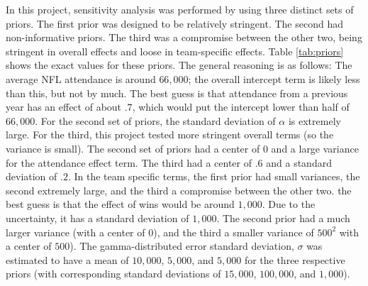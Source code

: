 \documentclass[11pt]{article}
\begin{document}
In this project, sensitivity analysis was performed by using three distinct sets of priors. The first prior was designed to be relatively stringent. The second had non-informative priors. The third was a compromise between the other two, being stringent in overall effects and loose in team-specific effects. Table \ref{tab:priors} shows the exact values for these priors. The general reasoning is as follows: The average NFL attendance is around $66{,}000$; the overall intercept term is likely less than this, but not by much. The best guess is that attendance from a previous year has an effect of about $.7$, which would put the intercept lower than half of $66{,}000$. For the second set of priors, the standard deviation of $\alpha$ is extremely large. For the third, this project tested more stringent overall terms (so the variance is small). The second set of priors had a center of $0$ and a large variance for the attendance effect term. The third had a center of $.6$ and a standard deviation of $.2$. In the team specific terms, the first prior had small variances, the second extremely large, and the third a compromise between the other two. the best guess is that the effect of wins would be around $1{,}000$. Due to the uncertainty, it has a standard deviation of $1{,}000$. The second prior had a much larger variance (with a center of $0$), and the third a smaller variance of $500^2$ with a center of $500$). The gamma-distributed error standard deviation, $\sigma$ was estimated to have a mean of $10{,}000$, $5{,}000$, and $5{,}000$ for the three respective priors (with corresponding standard deviations of $15{,}000$, $100{,}000$, and $1{,}000$). 
\end{document}
